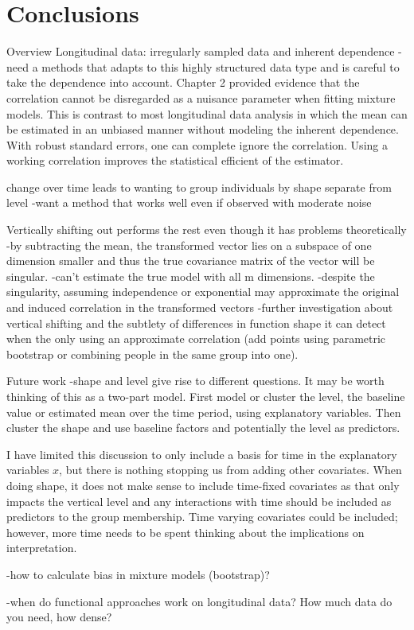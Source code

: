\chapter{Conclusions}
Overview
Longitudinal data: irregularly sampled data and inherent dependence
-need a methods that adapts to this highly structured data type and is careful to take the dependence into account. Chapter 2 provided evidence that the correlation cannot be disregarded as a nuisance parameter when fitting mixture models. This is contrast to most longitudinal data analysis in which the mean can be estimated in an unbiased manner without modeling the inherent dependence. With robust standard errors, one can complete ignore the correlation. Using a working correlation improves the statistical efficient of the estimator. 

change over time leads to wanting to group individuals by shape separate from level
-want a method that works well even if observed with moderate noise

Vertically shifting out performs the rest even though it has problems theoretically 
-by subtracting the  mean, the transformed vector lies on a subspace of one dimension smaller and thus the true covariance matrix of the vector will be singular. 
-can't estimate the true model with all m dimensions.
-despite the singularity, assuming independence or exponential may approximate the original and induced correlation in the transformed vectors
-further investigation about vertical shifting and the subtlety of differences in function shape it can detect when the only using an approximate correlation (add points using parametric bootstrap or combining people in the same group into one).


Future work
-shape and level give rise to different questions. It may be worth thinking of this as a two-part model. First model or cluster the level, the baseline value or estimated mean over the time period, using explanatory variables. Then cluster the shape and use baseline factors and potentially the level as predictors.

I have limited this discussion to only include a basis for time in the explanatory variables $x$, but there is nothing stopping us from adding other covariates. When doing shape, it does not make sense to include time-fixed covariates as that only impacts the vertical level and any interactions with time should be included as predictors to the group membership. Time varying covariates could be included; however, more time needs to be spent thinking about the implications on interpretation. 

-how to calculate bias in mixture models (bootstrap)?

-when do functional approaches work on longitudinal data? How much data do you need, how dense?